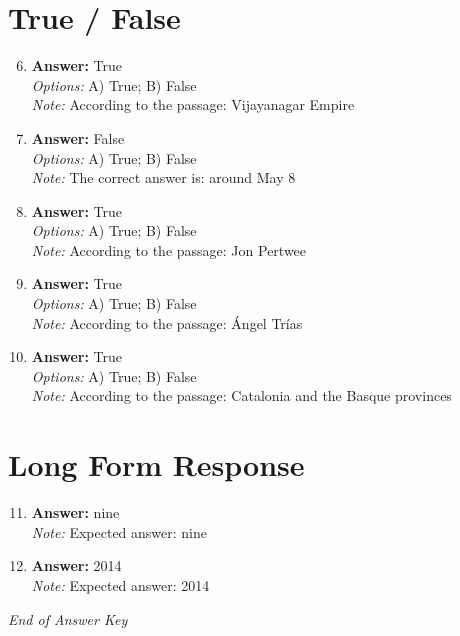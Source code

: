 \documentclass[12pt]{article}
\begin{document}
\section*{True / False}
\begin{enumerate}[label=\arabic*.]
\setcounter{enumi}{5}
\item \textbf{Answer:} True
\\ \textit{Options:} A) True; B) False
\\ \textit{Note:} According to the passage: Vijayanagar Empire
\item \textbf{Answer:} False
\\ \textit{Options:} A) True; B) False
\\ \textit{Note:} The correct answer is: around May 8
\item \textbf{Answer:} True
\\ \textit{Options:} A) True; B) False
\\ \textit{Note:} According to the passage: Jon Pertwee
\item \textbf{Answer:} True
\\ \textit{Options:} A) True; B) False
\\ \textit{Note:} According to the passage: Ángel Trías
\item \textbf{Answer:} True
\\ \textit{Options:} A) True; B) False
\\ \textit{Note:} According to the passage: Catalonia and the Basque provinces
\end{enumerate}

\section*{Long Form Response}
\begin{enumerate}[label=\arabic*.]
\setcounter{enumi}{10}
\item \textbf{Answer:} nine
\\ \textit{Note:} Expected answer: nine
\item \textbf{Answer:} 2014
\\ \textit{Note:} Expected answer: 2014
\end{enumerate}

\vfill
\noindent\textit{End of Answer Key}
\end{document}
